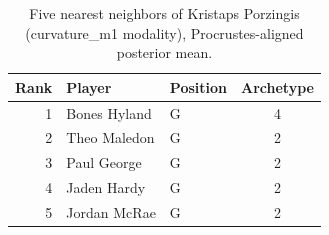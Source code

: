 \begin{table}[htbp]
  \centering\small
  \begin{tabular}{rllc}
    \toprule
    Rank & Player & Position & Archetype \\
    \midrule
    1 & Bones Hyland & G & 4 \\
    2 & Theo Maledon & G & 2 \\
    3 & Paul George & G & 2 \\
    4 & Jaden Hardy & G & 2 \\
    5 & Jordan McRae & G & 2 \\
    \bottomrule
  \end{tabular}
  \caption{Five nearest neighbors of Kristaps Porzingis (curvature_m1 modality), Procrustes-aligned posterior mean.}
  \label{tab:Kristaps_Porzingis_neighbors_curvature_m1}
\end{table}

